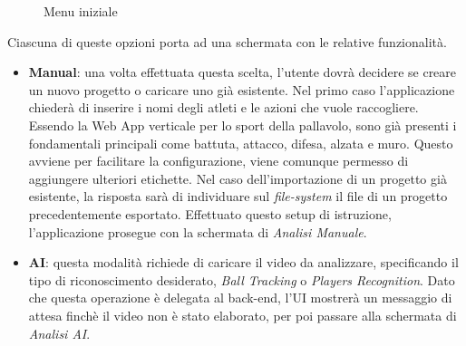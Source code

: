 \begin{figure}[h]
    \centering
    \caption{Menu iniziale}
    \label{fig:bot-menu-iniziale}
\end{figure}

\noindent Ciascuna di queste opzioni porta ad una schermata con le relative funzionalità.

\begin{itemize}
    \item \textbf{Manual}: una volta effettuata questa scelta, l'utente dovrà decidere se creare un nuovo progetto o caricare uno già esistente. Nel primo caso l'applicazione chiederà di inserire i nomi degli atleti e le azioni che vuole raccogliere. Essendo la Web App verticale per lo sport della pallavolo, sono già presenti i fondamentali principali come battuta, attacco, difesa, alzata e muro. Questo avviene per facilitare la configurazione, viene comunque permesso di aggiungere ulteriori etichette. Nel caso dell'importazione di un progetto già esistente, la risposta sarà di individuare sul \textit{file-system} il file di un progetto precedentemente esportato. Effettuato questo setup di istruzione, l'applicazione prosegue con la schermata di \textit{Analisi Manuale}.
    
    \item \textbf{AI}: questa modalità richiede di caricare il video da analizzare, specificando il tipo di riconoscimento desiderato, \textit{Ball Tracking} o \textit{Players Recognition}. Dato che questa operazione è delegata al back-end, l'UI mostrerà un messaggio di attesa finchè il video non è stato elaborato, per poi passare alla schermata di \textit{Analisi AI}.
    
\end{itemize}


